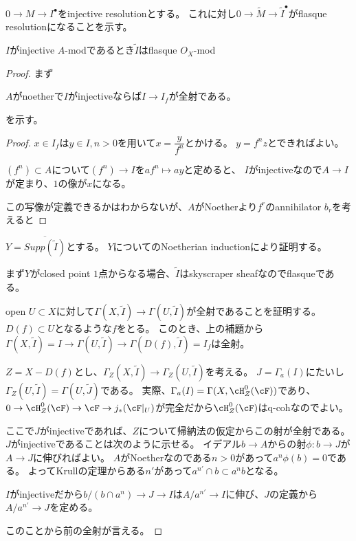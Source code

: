 \documentclass{jsarticle}
\begin{document}
$0\to M \to I^\bullet$をinjective resolutionとする。
これに対し$0 \to \tilde{M} \to \tilde{I}^\bullet$がflasque resolutionになることを示す。

\begin{lem}
$I$がinjective $A$-modであるとき$\tilde{I}$はflasque $O_X$-mod
\end{lem}
\begin{proof}
まず
\begin{lem}
$A$がnoetherで$I$がinjectiveならば$I \to I_f$が全射である。
\end{lem}
を示す。
\begin{proof}
$x \in I_f$は$y \in I, n>0$を用いて$x=\dfrac{y}{f^n}$とかける。
$y=f^nz$とできればよい。

$(f^n) \subset A$について$(f^n) \to I$を$af^n \mapsto ay$と定めると、
$I$がinjectiveなので$A \to I$が定まり、$1$の像が$x$になる。

この写像が定義できるかはわからないが、$A$がNoetherより$f^r$のannihilator $b_r$を考えると
\end{proof}

$Y=\overline{Supp(\tilde{I})}$とする。
$Y$についてのNoetherian inductionにより証明する。

まず$Y$がclosed point $1$点からなる場合、$\tilde{I}$はskyscraper sheafなのでflasqueである。

open $U \subset X$に対して$\Gamma(X, \tilde{I}) \to \Gamma(U, \tilde{I})$が全射であることを証明する。
$D(f) \subset U$となるような$f$をとる。
このとき、上の補題から$\Gamma(X, \tilde{I})=I \to \Gamma(U,\tilde{I}) \to \Gamma(D(f), \tilde{I})=I_f$は全射。

$Z=X-D(f)$とし、$\Gamma_Z(X, \tilde{I}) \to \Gamma_Z(U, \tilde{I})$を考える。
$J=\Gamma_a(I)$にたいし$\Gamma_Z(U, \tilde{I})=\Gamma(U, \tilde{J})$である。
実際、$\Gamma_a(I)=\Gamma(X, \cH_Z^0(\cF))$であり、
$0 \to \cH^0_Z(\cF) \to \cF \to j_*(\cF\vert_U)$が完全だから$\cH^0_Z(\cF)$はq-cohなのでよい。

ここで$J$がinjectiveであれば、$Z$について帰納法の仮定からこの射が全射である。
$J$がinjectiveであることは次のように示せる。
イデアル$b \to A$からの射$\phi:b \to J$が$A \to J$に伸びればよい。
$A$がNoetherなのである$n>0$があって$a^n\phi(b)=0$である。
よってKrullの定理からある$n'$があって$a^{n'}\cap b \subset a^nb$となる。

$I$がinjectiveだから$b/(b \cap a^n) \to J \to I$は$A/a^{n'} \to I$に伸び、$J$の定義から$A/a^{n'} \to J$を定める。

このことから前の全射が言える。
\end{proof}
\end{document}

